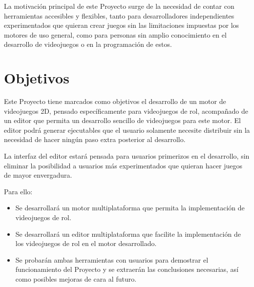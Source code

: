 \medskip

La motivación principal de este Proyecto surge de la necesidad de contar con herramientas accesibles y flexibles, tanto para desarrolladores independientes experimentados que quieran crear juegos sin las limitaciones impuestas por los motores de uso general, como para personas sin amplio conocimiento en el desarrollo de videojuegos o en la programación de estos.

\section{Objetivos}
Este Proyecto tiene marcados como objetivos el desarrollo de un motor de videojuegos 2D, pensado específicamente para videojuegos de rol, acompañado de un editor que permita un desarrollo sencillo de videojuegos para este motor. El editor podrá generar ejecutables que el usuario solamente necesite distribuir sin la necesidad de hacer ningún paso extra posterior al desarrollo.

\smallskip

La interfaz del editor estará pensada para usuarios primerizos en el desarrollo, sin eliminar la posibilidad a usuarios más experimentados que quieran hacer juegos de mayor envergadura.

\medskip

Para ello:
\begin{itemize}
	\item Se desarrollará un motor multiplataforma que permita la implementación de videojuegos de rol.
	\item Se desarrollará un editor multiplataforma que facilite la implementación de los videojuegos de rol en el motor desarrollado.
	\item Se probarán ambas herramientas con usuarios para demostrar el funcionamiento del Proyecto y se extraerán las conclusiones necesarias, así como posibles mejoras de cara al futuro.
\end{itemize}

